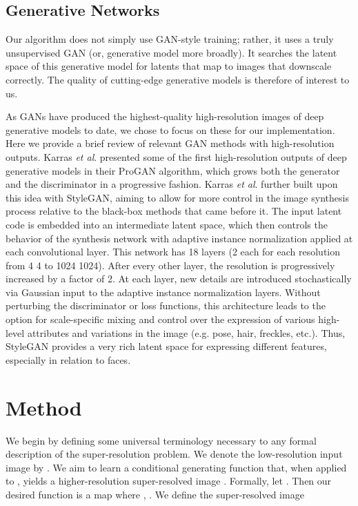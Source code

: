 \documentclass[10pt,twocolumn,letterpaper]{article}
\begin{document}
\subsection{Generative Networks}

Our algorithm does not simply use GAN-style training; rather, it uses a truly unsupervised GAN (or, generative model more broadly). It searches the latent space of this generative model for latents that map to images that downscale correctly. The quality of cutting-edge generative models is therefore of interest to us. 


As GANs have produced the highest-quality high-resolution images of deep generative models to date, we chose to focus on these for our implementation. Here we provide a brief review of relevant GAN methods with high-resolution outputs. Karras \textit{et al}. \cite{karras2017progressive} presented some of the first high-resolution outputs of deep generative models in their ProGAN algorithm, which grows both the generator and the discriminator in a progressive fashion. Karras \textit{et al}. \cite{karras2019style} further built upon this idea with StyleGAN, aiming to allow for more control in the image synthesis process relative to the black-box methods that came before it. The input latent code is embedded into an intermediate latent space, which then controls the behavior of the synthesis network with adaptive instance normalization applied at each convolutional layer. This network has 18 layers (2 each for each resolution from 4  4 to 1024  1024). After every other layer, the resolution is progressively increased by a factor of 2. At each layer, new details are introduced stochastically via Gaussian input to the adaptive instance normalization layers. Without perturbing the discriminator or loss functions, this architecture leads to the option for scale-specific mixing and control over the expression of various high-level attributes and variations in the image (e.g. pose, hair, freckles, etc.). Thus, StyleGAN provides a very rich latent space for expressing different features, especially in relation to faces. 








\section{Method}
We begin by defining some universal terminology necessary to any formal description of the super-resolution problem. We denote the low-resolution input image by . 
We aim to learn a conditional generating function  that, when applied to , yields a higher-resolution super-resolved image . Formally, let . Then our desired function  is a map  where , . We define the super-resolved image 
\end{document}

